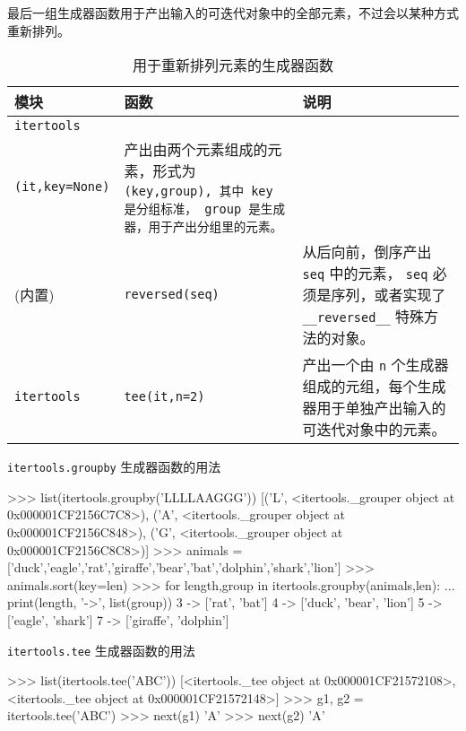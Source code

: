 最后一组生成器函数用于产出输入的可迭代对象中的全部元素，不过会以某种方式重新排列。

\begin{table}[H]
    \centering
    \caption{用于重新排列元素的生成器函数}
    \label{table:用于重新排列元素的生成器函数}
    \setlength{\tabcolsep}{2mm}
    \small
    \begin{tabular}{l|l|p{11cm}}
        \toprule
        \textbf{模块} & \textbf{函数} & \textbf{说明} \\
        \midrule
        \texttt{itertools} & \tabincell{l}{\texttt{groupby} \\ \texttt{(it,key=None)}} & 产出由两个元素组成的元素，形式为 \texttt{(key,group), 其中 \texttt{key} 是分组标准， \texttt{group} 是生成器，用于产出分组里的元素。}  \\ \midrule
        (内置) & \texttt{reversed(seq)} & 从后向前，倒序产出 \texttt{seq} 中的元素， \texttt{seq} 必须是序列，或者实现了 \texttt{\_\_reversed\_\_} 特殊方法的对象。 \\ \midrule
        \texttt{itertools} & \texttt{tee(it,n=2)} & 产出一个由 \texttt{n} 个生成器组成的元组，每个生成器用于单独产出输入的可迭代对象中的元素。 \\
        \bottomrule
    \end{tabular}
\end{table}

\texttt{itertools.groupby} 生成器函数的用法

\begin{python}
>>> list(itertools.groupby('LLLLAAGGG'))
[('L', <itertools._grouper object at 0x000001CF2156C7C8>), 
('A', <itertools._grouper object at 0x000001CF2156C848>), 
('G', <itertools._grouper object at 0x000001CF2156C8C8>)]
>>> animals = ['duck','eagle','rat','giraffe','bear','bat','dolphin','shark','lion']
>>> animals.sort(key=len)
>>> for length,group in itertools.groupby(animals,len):
...     print(length, '->', list(group))
3 -> ['rat', 'bat']
4 -> ['duck', 'bear', 'lion']
5 -> ['eagle', 'shark']
7 -> ['giraffe', 'dolphin']
\end{python}

\texttt{itertools.tee} 生成器函数的用法

\begin{python}
>>> list(itertools.tee('ABC'))
[<itertools._tee object at 0x000001CF21572108>, <itertools._tee object at 0x000001CF21572148>]
>>> g1, g2 = itertools.tee('ABC')
>>> next(g1)
'A'
>>> next(g2)
'A'
\end{python}

